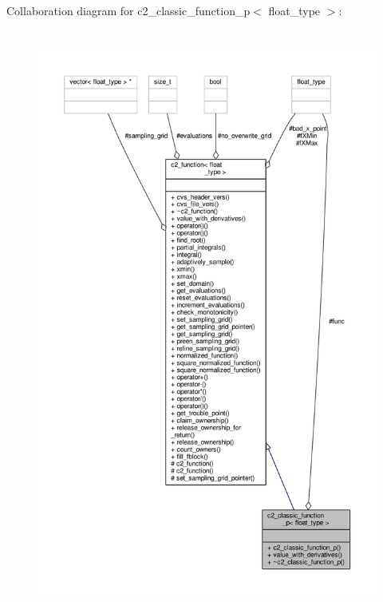 Collaboration diagram for c2\+\_\+classic\+\_\+function\+\_\+p$<$ float\+\_\+type $>$\+:
\nopagebreak
\begin{figure}[H]
\begin{center}
\leavevmode
\includegraphics[height=550pt]{classc2__classic__function__p__coll__graph}
\end{center}
\end{figure}
